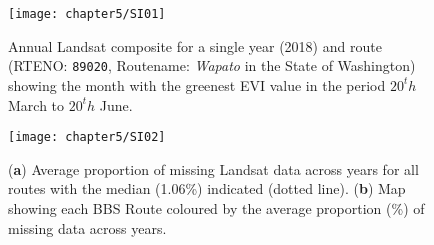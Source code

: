 \begin{figure}[htb]
\centering
\texttt{[image: chapter5/SI01]}
\caption{Annual Landsat composite for a single year (2018) and route (RTENO: \texttt{89020}, Routename: \textit{Wapato} in the State of Washington) showing the month with the greenest EVI value in the period $20^th$ March to $20^th$ June. }
\label{SI05_01}
\end{figure}

\begin{figure}[htb]
\centering
\texttt{[image: chapter5/SI02]}
\caption{(\textbf{a}) Average proportion of missing Landsat data across years for all routes with the median (1.06\%) indicated (dotted line). (\textbf{b}) Map showing each BBS Route coloured by the average proportion (\%) of missing data across years.}
\label{SI05_02}
\end{figure}